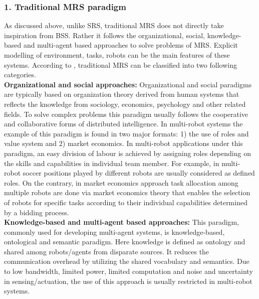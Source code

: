\subsubsection*{1. Traditional MRS paradigm}
As discussed above, unlike SRS, traditional MRS does not directly  take inspiration from BSS. Rather it follows the organizational, social, knowledge-based and multi-agent based approaches to solve problems of MRS. Explicit modelling of environment, tasks, robots can be the main features of these systems. According to ,  traditional MRS can be classified into two following categories.\\ 
\textbf{Organizational and social approaches: }
Organizational and social paradigms are typically based on organization theory derived from human systems that reflects the knowledge from sociology, economics, psychology and other related fields. To solve complex problems this paradigm usually follows the cooperative and collaborative forms of distributed intelligence. In multi-robot systems the example of this paradigm is found in two major formats: 1) the use of roles and value system and 2) market economics. In multi-robot applications under this paradigm, an easy division of labour is achieved by assigning roles depending on the skills and capabilities in individual team member. For example, in multi-robot soccer \cite{Stone+1999,Asada+1999} positions played by different robots are usually considered as defined roles. On the contrary, in market economics approach \cite{Gerkey+2002,Dias+2006} task allocation among multiple robots are done via market economics theory that enables the selection of robots for specific tasks according to their individual capabilities determined by a bidding process.\\
\textbf{Knowledge-based and multi-agent based approaches: }
This paradigm, commonly used for developing multi-agent systems, is knowledge-based, ontological and semantic paradigm. Here knowledge is defined as ontology and shared among robots/agents from disparate sources. It reduces the communication overhead by utilizing the shared vocabulary and semantics. Due to low bandwidth, limited power, limited computation and noise and uncertainty in sensing/actuation, the use of this approach is usually restricted in multi-robot systems. \\
